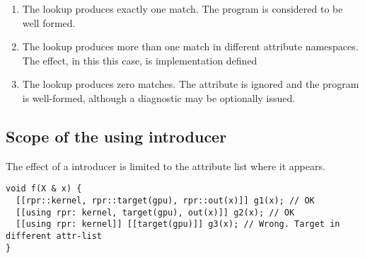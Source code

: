 \begin{enumerate}

\item The lookup produces exactly one match. The program is considered
to be well formed.

\item The lookup produces more than one match in different attribute namespaces.
The effect, in this this case, is implementation defined

\item The lookup produces zero matches. The attribute is ignored and the
program is well-formed, although a diagnostic may be optionally issued.

\end{enumerate}

\subsection{Scope of the using introducer}
\label{scoping}

The effect of a  introducer is limited to the attribute list
where it appears.

\begin{lstlisting}
void f(X & x) {
  [[rpr::kernel, rpr::target(gpu), rpr::out(x)]] g1(x); // OK
  [[using rpr: kernel, target(gpu), out(x)]] g2(x); // OK
  [[using rpr: kernel]] [[target(gpu)]] g3(x); // Wrong. Target in different attr-list
}
\end{lstlisting}
